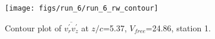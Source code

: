 \begin{figure}[H]
\centering
\texttt{[image: figs/run\_6/run\_6\_rw\_contour]}
\caption{Contour plot of $\overline{v_{r}^{\prime} v_{z}^{\prime}}$ at $z/c$=5.37, $V_{free}$=24.86, station 1.}
\label{fig:run_6_rw_contour}
\end{figure}


